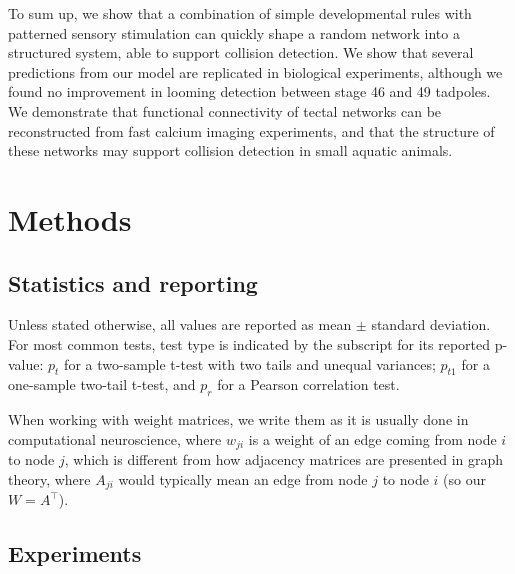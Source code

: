 \documentclass{article}
\begin{document}
To sum up, we show that a combination of simple developmental rules with patterned sensory stimulation can quickly shape a random network into a structured system, able to support collision detection. We show that several predictions from our model are replicated in biological experiments, although we found no improvement in looming detection between stage 46 and 49 tadpoles. We demonstrate that functional connectivity of tectal networks can be reconstructed from fast calcium imaging experiments, and that the structure of these networks may support collision detection in small aquatic animals.

\section*{Methods}


\subsection*{Statistics and reporting}

Unless stated otherwise, all values are reported as mean $\pm$ standard deviation. For most common tests, test type is indicated by the subscript for its reported p-value: $p_t$ for a two-sample t-test with two tails and unequal variances; $p_{t1}$ for a one-sample two-tail t-test, and $p_r$ for a Pearson correlation test.

When working with weight matrices, we write them as it is usually done in computational neuroscience, where $w_{ji}$ is a weight of an edge coming from node $i$ to node $j$, which is different from how adjacency matrices are presented in graph theory, where $A_{ji}$ would typically mean an edge from node $j$ to node $i$ (so our $W = A^\top$).

\subsection*{Experiments}
\end{document}
